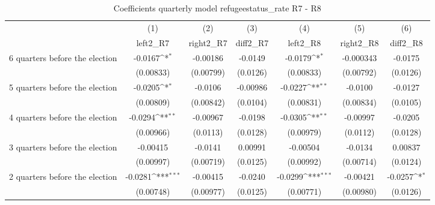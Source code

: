 \begin{table}[!ht]\centering \footnotesize
\def\sym#1{\ifmmode^{#1}\else\(^{#1}\)\fi}
\caption{Coefficients quarterly model refugeestatus\_rate R7 - R8}
\begin{tabular}{l*{6}{c}}
\hline\hline
                    &\multicolumn{1}{c}{(1)}&\multicolumn{1}{c}{(2)}&\multicolumn{1}{c}{(3)}&\multicolumn{1}{c}{(4)}&\multicolumn{1}{c}{(5)}&\multicolumn{1}{c}{(6)}\\
                    &\multicolumn{1}{c}{left2\_R7}&\multicolumn{1}{c}{right2\_R7}&\multicolumn{1}{c}{diff2\_R7}&\multicolumn{1}{c}{left2\_R8}&\multicolumn{1}{c}{right2\_R8}&\multicolumn{1}{c}{diff2\_R8}\\
\hline
 6 quarters before the election&     -0.0167\sym{*}  &    -0.00186         &     -0.0149         &     -0.0179\sym{*}  &   -0.000343         &     -0.0175         \\
                    &   (0.00833)         &   (0.00799)         &    (0.0126)         &   (0.00833)         &   (0.00792)         &    (0.0126)         \\
[1em]
 5 quarters before the election&     -0.0205\sym{*}  &     -0.0106         &    -0.00986         &     -0.0227\sym{**} &     -0.0100         &     -0.0127         \\
                    &   (0.00809)         &   (0.00842)         &    (0.0104)         &   (0.00831)         &   (0.00834)         &    (0.0105)         \\
[1em]
 4 quarters before the election&     -0.0294\sym{**} &    -0.00967         &     -0.0198         &     -0.0305\sym{**} &    -0.00997         &     -0.0205         \\
                    &   (0.00966)         &    (0.0113)         &    (0.0128)         &   (0.00979)         &    (0.0112)         &    (0.0128)         \\
[1em]
 3 quarters before the election&    -0.00415         &     -0.0141         &     0.00991         &    -0.00504         &     -0.0134         &     0.00837         \\
                    &   (0.00997)         &   (0.00719)         &    (0.0125)         &   (0.00992)         &   (0.00714)         &    (0.0124)         \\
[1em]
 2 quarters before the election&     -0.0281\sym{***}&    -0.00415         &     -0.0240         &     -0.0299\sym{***}&    -0.00421         &     -0.0257\sym{*}  \\
                    &   (0.00748)         &   (0.00977)         &    (0.0125)         &   (0.00771)         &   (0.00980)         &    (0.0126)         \\

\end{tabular}
\end{table}
